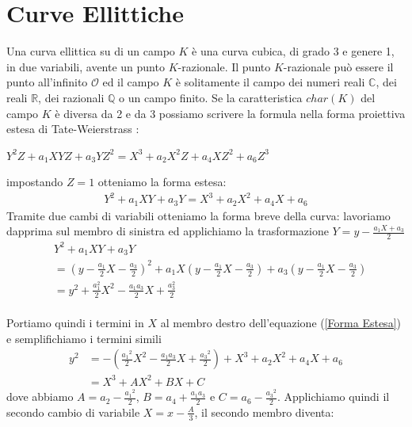 \documentclass[a4paper,12pt]{tesiinfo}
\newcommand\ddfrac[2]{\frac{\displaystyle #1}{\displaystyle #2}}
\begin{document}
\chapter{Curve Ellittiche}
\label{cap curve ellittiche}
Una curva ellittica su di un campo $K$ \`e una curva cubica, di grado 3 e genere 1, in due variabili, avente un punto $K$-razionale. Il punto $K$-razionale pu\`o essere il punto all'infinito $\mathcal{O}$ ed il campo $K$ \`e solitamente il campo dei numeri reali $\mathbb{C}$, dei reali $\mathbb{R}$, dei razionali $\mathbb{Q}$ o un campo finito. Se la caratteristica $char(K)$ del campo $K$ \`e diversa da 2 e da 3 possiamo scrivere la formula nella forma proiettiva estesa di Tate-Weierstrass \cite{Tate-Weier EQ}:
\begin{center}
$Y^{2}Z + a_1XYZ + a_3YZ^2 =X^3 + a_2X^2Z + a_4XZ^2 + a_6Z^3$
\end{center}
impostando $Z=1$ otteniamo la forma estesa: 
\begin{gather}
Y^{2} + a_1XY + a_3Y =X^3 + a_2X^2 + a_4X + a_6
\label{Forma Estesa}
\end{gather}
Tramite due cambi di variabili otteniamo la forma breve della curva: lavoriamo dapprima sul membro di sinistra ed applichiamo la trasformazione $Y = y - \ddfrac{a_1X + a_3}{2}$
\begin{align*}
&Y^{2} + a_1XY + a_3Y 
\\ 
&= \left ( y - \ddfrac{a_1}{2}X - \ddfrac{a_3}{2} \right )^2 + a_1X \left ( y - \ddfrac{a_1}{2}X - \ddfrac{a_3}{2} \right ) + a_3 \left ( y - \ddfrac{a_1}{2}X - \ddfrac{a_3}{2} \right ) 
\\
&= y^2 + \ddfrac{a_1^2}{2}X^2 - \ddfrac{a_1a_3}{2}X +\ddfrac{a_3^2}{2} 
\end{align*}
\\
Portiamo quindi i termini in $X$ al membro destro dell'equazione (\ref{Forma Estesa}) e semplifichiamo i termini simili
\begin{align*}
y^2 &= - \left ( \ddfrac{{a_1}^2}{2}X^2 - \ddfrac{a_1a_3}{2}X +\ddfrac{{a_3}^2}{2} \right ) + X^3 + a_2X^2 + a_4X + a_6
\\
&= X^3 + AX^2 + BX + C 
\end{align*}
dove abbiamo $A = a_2 - \ddfrac{{a_1}^2}{2}$, $B = a_4 + \ddfrac{a_1a_3}{2}$ e $C = a_6 - \ddfrac{{a_3}^2}{2}$.
Applichiamo quindi il secondo cambio di variabile $X = x - \ddfrac{A}{3}$, il secondo membro diventa:
\end{document}

